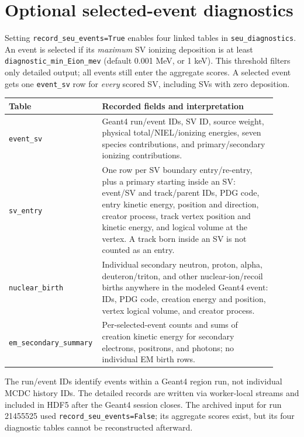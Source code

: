 \documentclass[11pt]{article}
\begin{document}
\section{Optional selected-event diagnostics}

Setting \texttt{record\_seu\_events=True} enables four linked tables in
\texttt{seu\_diagnostics}. An event is selected if its \emph{maximum} SV
ionizing deposition is at least
\texttt{diagnostic\_min\_Eion\_mev} (default 0.001 MeV, or 1 keV).
This threshold filters only detailed output; all events still enter the
aggregate scores. A selected event gets one \texttt{event\_sv} row for
\emph{every} scored SV, including SVs with zero deposition.

\begin{center}
\begin{tabular}{p{0.27\linewidth}p{0.64\linewidth}}
\toprule
Table & Recorded fields and interpretation \\
\midrule
\texttt{event\_sv} & Geant4 run/event IDs, SV ID, source weight, physical total/NIEL/ionizing energies, seven species contributions, and primary/secondary ionizing contributions. \\
\texttt{sv\_entry} & One row per SV boundary entry/re-entry, plus a primary starting inside an SV: event/SV and track/parent IDs, PDG code, entry kinetic energy, position and direction, creator process, track vertex position and kinetic energy, and logical volume at the vertex. A track born inside an SV is not counted as an entry. \\
\texttt{nuclear\_birth} & Individual secondary neutron, proton, alpha, deuteron/triton, and other nuclear-ion/recoil births anywhere in the modeled Geant4 event: IDs, PDG code, creation energy and position, vertex logical volume, and creator process. \\
\texttt{em\_secondary\_summary} & Per-selected-event counts and sums of creation kinetic energy for secondary electrons, positrons, and photons; no individual EM birth rows. \\
\bottomrule
\end{tabular}
\end{center}

The run/event IDs identify events within a Geant4 region run, not individual
MCDC history IDs. The detailed records are written via worker-local streams
and included in HDF5 after the Geant4 session closes. The archived input for
run 21455525 used \texttt{record\_seu\_events=False}; its aggregate scores
exist, but its four diagnostic tables cannot be reconstructed afterward.
\end{document}
